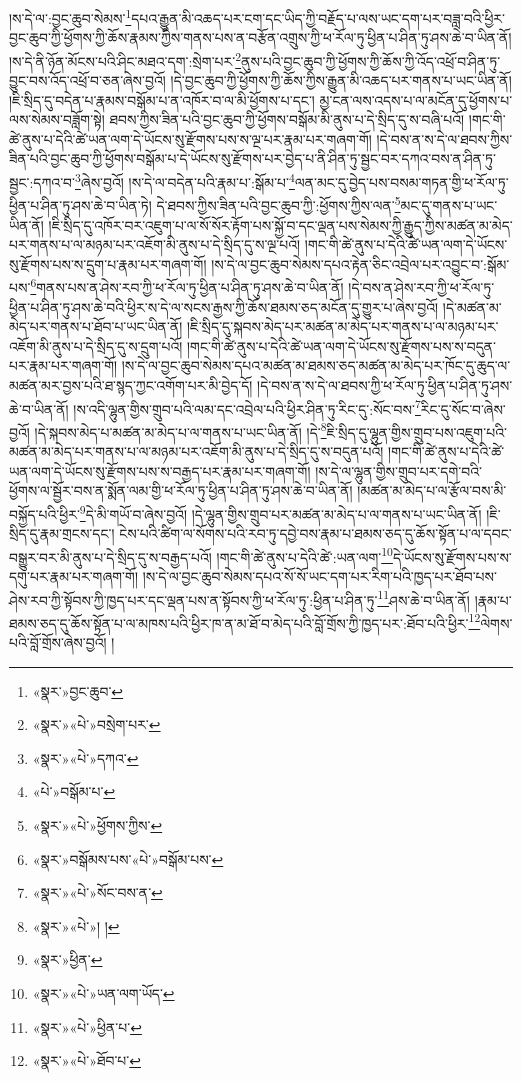 །ས་དེ་ལ་:བྱང་ཆུབ་སེམས་\footnote{«སྣར་»བྱང་ཆུབ་}དཔའ་རྒྱུན་མི་འཆད་པར་ངག་དང་ཡིད་ཀྱི་བརྗོད་པ་ལས་ཡང་དག་པར་བཟླ་བའི་ཕྱིར་བྱང་ཆུབ་ཀྱི་ཕྱོགས་ཀྱི་ཆོས་རྣམས་ཀྱིས་གནས་པས་ན་བརྩོན་འགྲུས་ཀྱི་ཕ་རོལ་ཏུ་ཕྱིན་པ་ཤིན་ཏུ་ཤས་ཆེ་བ་ཡིན་ནོ། །ས་དེ་ནི་ཉོན་མོངས་པའི་ཤིང་མཐའ་དག་:སྲེག་པར་\footnote{«སྣར་»«པེ་»བསྲེག་པར་}ནུས་པའི་བྱང་ཆུབ་ཀྱི་ཕྱོགས་ཀྱི་ཆོས་ཀྱི་འོད་འཕྲོ་བ་ཤིན་ཏུ་བྱུང་བས་འོད་འཕྲོ་བ་ཅན་ཞེས་བྱའོ། །དེ་བྱང་ཆུབ་ཀྱི་ཕྱོགས་ཀྱི་ཆོས་ཀྱིས་རྒྱུན་མི་འཆད་པར་གནས་པ་ཡང་ཡིན་ནོ། །ཇི་སྲིད་དུ་བདེན་པ་རྣམས་བསྒོམ་པ་ན་འཁོར་བ་ལ་མི་ཕྱོགས་པ་དང་། མྱ་ངན་ལས་འདས་པ་ལ་མངོན་དུ་ཕྱོགས་པ་ལས་སེམས་བཟློག་སྟེ། ཐབས་ཀྱིས་ཟིན་པའི་བྱང་ཆུབ་ཀྱི་ཕྱོགས་བསྒོམ་མི་ནུས་པ་དེ་སྲིད་དུ་ས་བཞི་པའོ། །གང་གི་ཚེ་ནུས་པ་དེའི་ཚེ་ཡན་ལག་དེ་ཡོངས་སུ་རྫོགས་པས་ས་ལྔ་པར་རྣམ་པར་གཞག་གོ། །དེ་བས་ན་ས་དེ་ལ་ཐབས་ཀྱིས་ཟིན་པའི་བྱང་ཆུབ་ཀྱི་ཕྱོགས་བསྒོམ་པ་དེ་ཡོངས་སུ་རྫོགས་པར་བྱེད་པ་ནི་ཤིན་ཏུ་སྦྱང་བར་དཀའ་བས་ན་ཤིན་ཏུ་སྦྱང་:དཀའ་བ་\footnote{«སྣར་»«པེ་»དཀའ་}ཞེས་བྱའོ། །ས་དེ་ལ་བདེན་པའི་རྣམ་པ་:སྒོམ་པ་\footnote{«པེ་»བསྒོམ་པ་}ལན་མང་དུ་བྱེད་པས་བསམ་གཏན་གྱི་ཕ་རོལ་ཏུ་ཕྱིན་པ་ཤིན་ཏུ་ཤས་ཆེ་བ་ཡིན་ཏེ། དེ་ཐབས་ཀྱིས་ཟིན་པའི་བྱང་ཆུབ་ཀྱི་:ཕྱོགས་ཀྱིས་ལན་\footnote{«སྣར་»«པེ་»ཕྱོགས་ཀྱིས་}མང་དུ་གནས་པ་ཡང་ཡིན་ནོ། །ཇི་སྲིད་དུ་འཁོར་བར་འཇུག་པ་ལ་སོ་སོར་རྟོག་པས་སྐྱོ་བ་དང་ལྡན་པས་སེམས་ཀྱི་རྒྱུད་ཀྱིས་མཚན་མ་མེད་པར་གནས་པ་ལ་མཉམ་པར་འཇོག་མི་ནུས་པ་དེ་སྲིད་དུ་ས་ལྔ་པའོ། །གང་གི་ཚེ་ནུས་པ་དེའི་ཚེ་ཡན་ལག་དེ་ཡོངས་སུ་རྫོགས་པས་ས་དྲུག་པ་རྣམ་པར་གཞག་གོ། །ས་དེ་ལ་བྱང་ཆུབ་སེམས་དཔའ་རྟེན་ཅིང་འབྲེལ་པར་འབྱུང་བ་:སྒོམ་པས་\footnote{«སྣར་»བསྒོམས་པས་«པེ་»བསྒོམ་པས་}གནས་པས་ན་ཤེས་རབ་ཀྱི་ཕ་རོལ་ཏུ་ཕྱིན་པ་ཤིན་ཏུ་ཤས་ཆེ་བ་ཡིན་ནོ། །དེ་བས་ན་ཤེས་རབ་ཀྱི་ཕ་རོལ་ཏུ་ཕྱིན་པ་ཤིན་ཏུ་ཤས་ཆེ་བའི་ཕྱིར་ས་དེ་ལ་སངས་རྒྱས་ཀྱི་ཆོས་ཐམས་ཅད་མངོན་དུ་གྱུར་པ་ཞེས་བྱའོ། །དེ་མཚན་མ་མེད་པར་གནས་པ་ཐོབ་པ་ཡང་ཡིན་ནོ། །ཇི་སྲིད་དུ་སྐབས་མེད་པར་མཚན་མ་མེད་པར་གནས་པ་ལ་མཉམ་པར་འཇོག་མི་ནུས་པ་དེ་སྲིད་དུ་ས་དྲུག་པའོ། །གང་གི་ཚེ་ནུས་པ་དེའི་ཚེ་ཡན་ལག་དེ་ཡོངས་སུ་རྫོགས་པས་ས་བདུན་པར་རྣམ་པར་གཞག་གོ། །ས་དེ་ལ་བྱང་ཆུབ་སེམས་དཔའ་མཚན་མ་ཐམས་ཅད་མཚན་མ་མེད་པར་ཁོང་དུ་ཆུད་ལ་མཚན་མར་བྱས་པའི་ཐ་སྙད་ཀྱང་འགོག་པར་མི་བྱེད་དོ། །དེ་བས་ན་ས་དེ་ལ་ཐབས་ཀྱི་ཕ་རོལ་ཏུ་ཕྱིན་པ་ཤིན་ཏུ་ཤས་ཆེ་བ་ཡིན་ནོ། །ས་འདི་ལྷུན་གྱིས་གྲུབ་པའི་ལམ་དང་འབྲེལ་པའི་ཕྱིར་ཤིན་ཏུ་རིང་དུ་:སོང་བས་\footnote{«སྣར་»«པེ་»སོང་བས་ན་}རིང་དུ་སོང་བ་ཞེས་བྱའོ། །དེ་སྐབས་མེད་པ་མཚན་མ་མེད་པ་ལ་གནས་པ་ཡང་ཡིན་ནོ། །དེ་\footnote{«སྣར་»«པེ་»། །}ཇི་སྲིད་དུ་ལྷུན་གྱིས་གྲུབ་པས་འཇུག་པའི་མཚན་མ་མེད་པར་གནས་པ་ལ་མཉམ་པར་འཇོག་མི་ནུས་པ་དེ་སྲིད་དུ་ས་བདུན་པའོ། །གང་གི་ཚེ་ནུས་པ་དེའི་ཚེ་ཡན་ལག་དེ་ཡོངས་སུ་རྫོགས་པས་ས་བརྒྱད་པར་རྣམ་པར་གཞག་གོ། །ས་དེ་ལ་ལྷུན་གྱིས་གྲུབ་པར་དགེ་བའི་ཕྱོགས་ལ་སྦྱོར་བས་ན་སྨོན་ལམ་གྱི་ཕ་རོལ་ཏུ་ཕྱིན་པ་ཤིན་ཏུ་ཤས་ཆེ་བ་ཡིན་ནོ། །མཚན་མ་མེད་པ་ལ་རྩོལ་བས་མི་བསྐྱོད་པའི་ཕྱིར་\footnote{«སྣར་»ཕྱིན་}དེ་མི་གཡོ་བ་ཞེས་བྱའོ། །དེ་ལྷུན་གྱིས་གྲུབ་པར་མཚན་མ་མེད་པ་ལ་གནས་པ་ཡང་ཡིན་ནོ། །ཇི་སྲིད་དུ་རྣམ་གྲངས་དང་། ངེས་པའི་ཚིག་ལ་སོགས་པའི་རབ་ཏུ་དབྱེ་བས་རྣམ་པ་ཐམས་ཅད་དུ་ཆོས་སྟོན་པ་ལ་དབང་བསྒྱུར་བར་མི་ནུས་པ་དེ་སྲིད་དུ་ས་བརྒྱད་པའོ། །གང་གི་ཚེ་ནུས་པ་དེའི་ཚེ་:ཡན་ལག་\footnote{«སྣར་»«པེ་»ཡན་ལག་ཡོད་}དེ་ཡོངས་སུ་རྫོགས་པས་ས་དགུ་པར་རྣམ་པར་གཞག་གོ། །ས་དེ་ལ་བྱང་ཆུབ་སེམས་དཔའ་སོ་སོ་ཡང་དག་པར་རིག་པའི་ཁྱད་པར་ཐོབ་པས་ཤེས་རབ་ཀྱི་སྟོབས་ཀྱི་ཁྱད་པར་དང་ལྡན་པས་ན་སྟོབས་ཀྱི་ཕ་རོལ་ཏུ་:ཕྱིན་པ་ཤིན་ཏུ་\footnote{«སྣར་»«པེ་»ཕྱིན་པ་}ཤས་ཆེ་བ་ཡིན་ནོ། །རྣམ་པ་ཐམས་ཅད་དུ་ཆོས་སྟོན་པ་ལ་མཁས་པའི་ཕྱིར་ཁ་ན་མ་ཐོ་བ་མེད་པའི་བློ་གྲོས་ཀྱི་ཁྱད་པར་:ཐོབ་པའི་ཕྱིར་\footnote{«སྣར་»«པེ་»ཐོབ་པ་}ལེགས་པའི་བློ་གྲོས་ཞེས་བྱའོ། །
